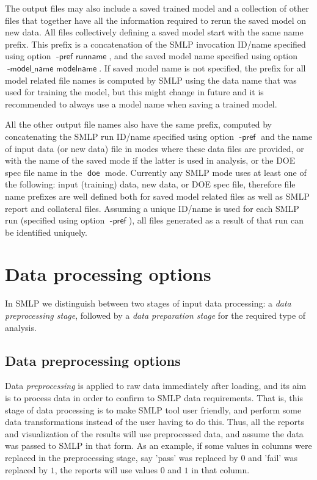 \documentclass[a4paper,parskip=half]{article} %
\newcommand*\option[1]{\operatorname{\mathsf{#1}}} %
\newcommand*\mode[1]{\operatorname{\mathsf{#1}}} %
\begin{document}
The output files may also include a saved trained model and a collection of other files that together have all the information
required to rerun the saved model on new data. All files collectively defining a saved model start with the same name prefix.
This prefix is a concatenation of the SMLP invocation ID/name specified using option $\option{-pref\,\,runname}$, and the
saved model name specified using option $\option{-model\_name\,\, modelname}$. If saved model name is not specified,
the prefix for all model related file names is computed by SMLP using the data name that was used for training the model,
but this might change in future and it is recommended to always use a model name when saving a trained model. 

All the other output file names also have the same prefix, computed by concatenating the SMLP run ID/name 
specified using option  $\option{-pref}$ and the name of input data (or new data) file in modes where these
data files are provided, or with the name of the saved mode if the latter is used in analysis, or the DOE spec file
name in the $\mode{doe}$ mode. Currently any SMLP mode uses at least one of the following: input (training)
data, new data, or DOE spec file, therefore file name prefixes are well defined both for saved model related files
as well as SMLP report and collateral files. Assuming a unique ID/name is used for each SMLP run (specified
using option $\option{-pref}$), all files generated as a result of that run can be identified uniquely.



\section{Data processing options}\label{sec:data}

In SMLP we distinguish between two stages of input data processing: a \emph{data preprocessing stage}, 
followed by a \emph{data preparation stage} for the required type of analysis. 


\subsection{Data preprocessing options}

Data \emph{preprocessing} is applied to raw data immediately after loading, and its aim is to process
data in order to confirm to SMLP data requirements. That is, this
stage of data processing is to make SMLP tool user friendly, and perform some data 
transformations instead of the user having to do this. Thus, all the reports and visualization
of the results will use preprocessed data, and assume the data was passed to SMLP in that
form. As an example, if some values in columns were replaced in the preprocessing stage, 
say 'pass' was replaced by $0$ and 'fail' was replaced by $1$, the reports will use values 
$0$ and $1$ in that column. 
\end{document}
